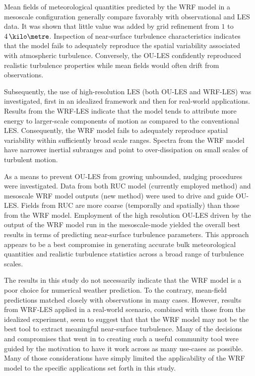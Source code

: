 Mean fields of meteorological quantities predicted by the WRF model in a mesoscale configuration generally compare favorably with observational and LES data. It was shown that little value was added by grid refinement from $1$ to $4\, \kilo\metre$. Inspection of near-surface turbulence characteristics indicates that the model fails to adequately reproduce the spatial variability associated with atmospheric turbulence. Conversely, the OU-LES confidently reproduced realistic turbulence properties while mean fields would often drift from observations.

Subsequently, the use of high-resolution LES (both OU-LES and WRF-LES) was investigated, first in an idealized framework and then for real-world applications. Results from the WRF-LES indicate that the model tends to attribute more energy to larger-scale components of motion as compared to the conventional LES. Consequently, the WRF model fails to adequately reproduce spatial variability within sufficiently broad scale ranges. Spectra from the WRF model have narrower inertial subranges and point to over-dissipation on small scales of turbulent motion. 

As a means to prevent OU-LES from growing unbounded, nudging procedures were investigated. Data from both RUC model (currently employed method) and mesoscale WRF model outputs (new method) were used to drive and guide OU-LES. Fields from RUC are more coarse (temporally and spatially) than those from the WRF model. Employment of the high resolution OU-LES driven by the output of the WRF model run in the mesoscale-mode yielded the overall best results in terms of predicting near-surface turbulence parameters. This approach appears to be a best compromise in generating accurate bulk meteorological quantities and realistic turbulence statistics across a broad range of turbulence scales.

The results in this study do not necessarily indicate that the WRF model is a poor choice for numerical weather prediction. To the contrary, mean-field predictions matched closely with observations in many cases. However, results from WRF-LES applied in a real-world scenario, combined with those from the idealized experiment, seem to suggest that that the WRF model may not be the best tool to extract meaningful near-surface turbulence. Many of the decisions and compromises that went in to creating such a useful community tool were guided by the motivation to have it work across as many use-cases as possible. Many of those considerations have simply limited the applicability of the WRF model to the specific applications set forth in this study. 

